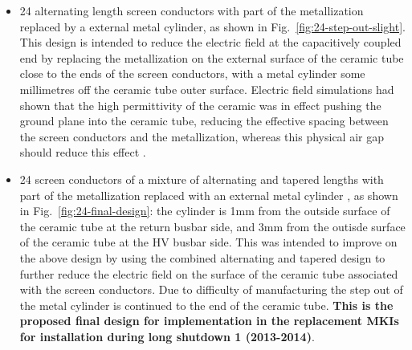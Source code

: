 \begin{itemize}
\item{24 alternating length screen conductors with part of the metallization replaced by a external metal cylinder, as shown in Fig.~\ref{fig:24-step-out-slight}. This design is intended to reduce the electric field at the capacitively coupled end by replacing the metallization on the external surface of the ceramic tube close to the ends of the screen conductors, with a metal cylinder some millimetres off the ceramic tube outer surface. Electric field simulations had shown that the high permittivity of the ceramic was in effect pushing the ground plane into the ceramic tube, reducing the effective spacing between the screen conductors and the metallization, whereas this physical air gap should reduce this effect \cite{Barnes:mkiAlt}.}
\item{24 screen conductors of a mixture of alternating and tapered lengths with part of the metallization replaced with an external metal cylinder \cite{Barnes:mkiElecSurfCer}, as shown in Fig.~\ref{fig:24-final-design}: the cylinder is 1mm from the outside surface of the ceramic tube at the return busbar side, and 3mm from the outisde surface of the ceramic tube at the HV busbar side. This was intended to improve on the above design by using the combined alternating and tapered design to further reduce the electric field on the surface of the ceramic tube associated with the screen conductors. Due to difficulty of manufacturing the step out of the metal cylinder is continued to the end of the ceramic tube. \textbf{This is the proposed final design for implementation in the replacement MKIs for installation during long shutdown 1 (2013-2014)}.}
\end{itemize}

